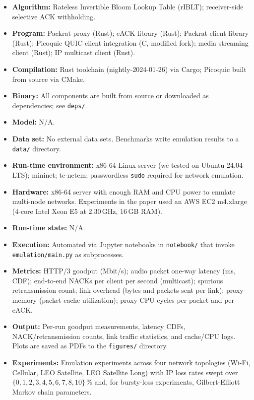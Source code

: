 \documentclass[sigplan,review]{acmart}
\begin{document}
{\small
\begin{itemize}
  \item {\bf Algorithm: } Rateless Invertible Bloom Lookup Table (rIBLT); receiver-side selective ACK withholding.
  \item {\bf Program: } Packrat proxy (Rust); eACK library (Rust); Packrat client library (Rust); Picoquic QUIC client integration (C, modified fork); media streaming client (Rust); IP multicast client (Rust).
  \item {\bf Compilation: } Rust toolchain (nightly-2024-01-26) via Cargo; Picoquic built from source via CMake.
  \item {\bf Binary: } All components are built from source or downloaded as dependencies; see \texttt{deps/}.
  \item {\bf Model: } N/A.
  \item {\bf Data set: } No external data sets. Benchmarks write emulation results to a \texttt{data/} directory.
  \item {\bf Run-time environment: } x86-64 Linux server (we tested on Ubuntu 24.04 LTS);
    mininet; tc-netem; passwordless \texttt{sudo} required for network emulation.
  \item {\bf Hardware: } x86-64 server with enough RAM and CPU power to emulate multi-node networks.
  Experiments in the paper used an AWS EC2 m4.xlarge (4-core Intel Xeon E5 at 2.30\,GHz, 16\,GB RAM).
  \item {\bf Run-time state: } N/A.
  \item {\bf Execution: } Automated via Jupyter notebooks in
    \texttt{notebook/} that invoke \texttt{emulation/main.py} as
    subprocesses.
  \item {\bf Metrics: } HTTP/3 goodput (Mbit/s); audio packet one-way
    latency (ms, CDF); end-to-end NACKs per client per second (multicast);
    spurious retransmission count; link overhead (bytes and packets sent
    per link); proxy memory (packet cache utilization); proxy CPU cycles
    per packet and per eACK.
  \item {\bf Output: } Per-run goodput measurements, latency CDFs,
    NACK/retransmission counts, link traffic statistics, and cache/CPU
    logs. Plots are saved as PDFs to the \texttt{figures/} directory.
  \item {\bf Experiments: } Emulation experiments across four
    network topologies (Wi-Fi, Cellular, LEO Satellite, LEO Satellite
    Long) with IP loss rates swept over
    $\{0,1,2,3,4,5,6,7,8,10\}$\,\% and, for bursty-loss experiments,
    Gilbert-Elliott Markov chain parameters.

\end{itemize}}
\end{document}
